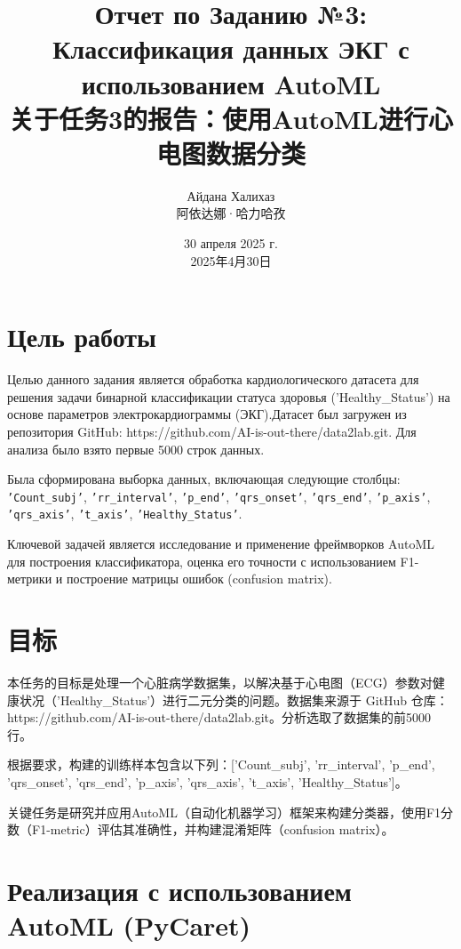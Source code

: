 \documentclass{article}
\title{Отчет по Заданию №3: Классификация данных ЭКГ с использованием AutoML  \\ \large 关于任务3的报告：使用AutoML进行心电图数据分类}
\author{Айдана Халихаз \\ 阿依达娜·哈力哈孜}
\date{30 апреля 2025 г. \\ 2025年4月30日}
\providecommand{\pcsync}{\par\vspace{\baselineskip}}
\begin{document}
\maketitle

\begin{paracol}{2}
\setlength{\columnsep}{20pt}
\setlength{\emergencystretch}{3em}

\section{Цель работы}
\pcsync
Целью данного задания является обработка кардиологического датасета для решения задачи бинарной классификации статуса здоровья ('Healthy\_Status') на основе параметров электрокардиограммы (ЭКГ).Датасет был загружен из репозитория GitHub: https://github.com/AI-is-out-there/data2lab.git. Для анализа было взято первые 5000 строк данных.

Была сформирована выборка данных, включающая следующие столбцы: {\texttt{'Count\_subj'}, \texttt{'rr\_interval'}, \texttt{'p\_end'}, \texttt{'qrs\_onset'}, \texttt{'qrs\_end'}, \texttt{'p\_axis'}, \texttt{'qrs\_axis'}, \texttt{'t\_axis'}, \texttt{'Healthy\_Status'}}.

Ключевой задачей является исследование и применение фреймворков AutoML для построения классификатора, оценка его точности с использованием F1-метрики и построение матрицы ошибок (confusion matrix).
\switchcolumn %

\section{目标}
\pcsync 
本任务的目标是处理一个心脏病学数据集，以解决基于心电图（ECG）参数对健康状况（'Healthy\_Status'）进行二元分类的问题。数据集来源于 GitHub 仓库：https://github.com/AI-is-out-there/data2lab.git。分析选取了数据集的前5000行。

根据要求，构建的训练样本包含以下列：['Count\_subj', 'rr\_interval', 'p\_end', 'qrs\_onset', 'qrs\_end', 'p\_axis', 'qrs\_axis', 't\_axis', 'Healthy\_Status']。

关键任务是研究并应用AutoML（自动化机器学习）框架来构建分类器，使用F1分数（F1-metric）评估其准确性，并构建混淆矩阵（confusion matrix）。
\switchcolumn* %

\section{Реализация с использованием AutoML (PyCaret)}

\end{paracol}
\end{document}
